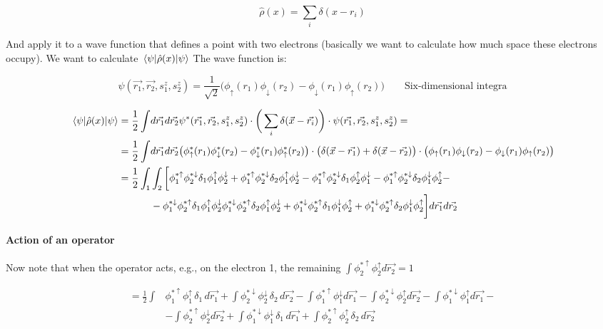 			$$\hat{\rho}(x)=\sum_i\delta(x-r_i)$$

			And apply it to a wave function that defines a point with two electrons (basically we want to calculate how much space these electrons occupy).
			We want to calculate $\mel{\psi}{\hat{\rho}(x)}{\psi}$
			The wave function is:

			$$\psi(\vec{r_1},\vec{r_2},s_1^z,s_2^z)=\frac{1}{\sqrt{2}}\big(\phi_\uparrow(r_1)\phi_\downarrow(r_2)-\phi_\downarrow(r_1)\phi_\uparrow(r_2)\big)\qquad\text{Six-dimensional integra}$$


			\begin{align*}
				\mel{\psi}{\hat{\rho}(x)}{\psi}=\frac{1}{2}\int &d\vec{r_1}d\vec{r_2} \psi^*(\vec{r_1},\vec{r_2},s_1^z,s_2^z)\cdot\bigg(\sum_i \delta(\vec{x}-\vec{r_i})\bigg)\cdot\psi(\vec{r_1},\vec{r_2},s_1^z,s_2^z)=\\
				=\frac{1}{2}\int &d\vec{r_1}d\vec{r_2}\big(\phi^*_\uparrow(r_1)\phi^*_\downarrow(r_2)-\phi^*_\downarrow(r_1)\phi^*_\uparrow(r_2)\big)\cdot\big(\delta(\vec{x}-\vec{r_1})+\delta(\vec{x}-\vec{r_2})\big)\cdot\big(\phi_\uparrow(r_1)\phi_\downarrow(r_2)-\phi_\downarrow(r_1)\phi_\uparrow(r_2)\big)\\
				=\frac{1}{2}\int_1&\int_2\bigg[\phi_1^{*\uparrow}\phi_2^{*\downarrow}\delta_1\phi_1^\uparrow\phi_2^\downarrow+\phi_1^{*\uparrow}\phi_2^{*\downarrow}\delta_2\phi_1^\uparrow\phi_2^\downarrow-\phi_1^{*\uparrow}\phi_2^{*\downarrow}\delta_1\phi_2^\uparrow\phi_1^\downarrow-\phi_1^{*\uparrow}\phi_2^{*\downarrow}\delta_2\phi_1^\downarrow\phi_2^\uparrow-\\
													&-\phi_1^{*\downarrow}\phi_2^{*\uparrow}\delta_1\phi_1^\uparrow\phi_2^\downarrow\phi_1^{*\downarrow}\phi_2^{*\uparrow}\delta_2\phi_1^\uparrow\phi_2^\downarrow+\phi_1^{*\downarrow}\phi_2^{*\uparrow}\delta_1\phi_1^\downarrow\phi_2^\uparrow+\phi_1^{*\downarrow}\phi_2^{*\uparrow}\delta_2\phi_1^\downarrow\phi_2^\uparrow\bigg]d\vec{r_1}d\vec{r_2}
			\end{align*}

			\paragraph{Action of an operator}
			Now note that when the operator acts, e.g., on the electron 1, the remaining $\int \phi_2^{*\uparrow}\phi_2^\uparrow d\vec{r_2}=1$

			\begin{align*}
				=\frac{1}{2}\int&\phi_1^{*\uparrow}\phi_1^\uparrow \,\delta_1\, d\vec{r_1}+\int \phi_2^{*\downarrow}\phi_2^\downarrow\, \delta_2\, d\vec{r_2}-\int \phi_1^{*\uparrow}\phi_1^\downarrow d\vec{r_1}-\int \phi_2^{*\downarrow}\phi_2^\uparrow d\vec{r_2}-\int \phi_1^{*\downarrow}\phi_1^\uparrow d\vec{r_1}-\\
												&-\int \phi_2^{*\uparrow}\phi_2^\downarrow d\vec{r_2}+\int \phi_1^{*\downarrow}\phi_1^\downarrow\, \delta_1\, d\vec{r_1}+\int \phi_2^{*\uparrow}\phi_2^\uparrow\, \delta_2\, d\vec{r_2}
			\end{align*}

